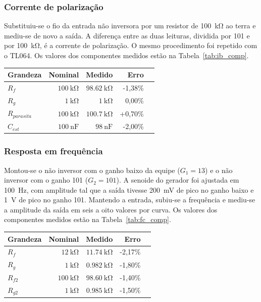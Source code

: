 \documentclass[11pt,a4paper]{article}
\begin{document}
\subsubsection{Corrente de polarização}

Substituiu-se o fio da entrada não inversora por um resistor de \SI{100}{\kilo\ohm} ao terra e mediu-se de novo a saída. A diferença entre as duas leituras, dividida por 101 e por \SI{100}{\kilo\ohm}, é a corrente de polarização. O mesmo procedimento foi repetido com o TL064. Os valores dos componentes medidos estão na Tabela~\ref{tab:ib_comp}.

\begin{center}
\begin{tabular}{@{}lrrrr@{}}
\toprule
\label{tab:ib_comp}
\textbf{Grandeza} & \textbf{Nominal} & \textbf{Medido} & \textbf{Erro} \\
\midrule
  $R_f$ & $\SI{100}{\kilo\ohm}$ & $\SI{98,62}{\kilo\ohm}$ & -1,38\% \\
  $R_g$ & $\SI{1}{\kilo\ohm}$ & $\SI{1}{\kilo\ohm}$ & 0,00\% \\
  $R_{parasita} $ & $\SI{100}{\kilo\ohm}$ & $\SI{100,7}{\kilo\ohm}$ & +0,70\% \\
  $C_{est}$ & $\SI{100}{\nano\farad}$ & $\SI{98}{\nano\farad}$ & -2,00\% \\
\bottomrule
\end{tabular}
\end{center}

\subsubsection{Resposta em frequência}

Montou-se o não inversor com o ganho baixo da equipe ($G_1 = 13$) e o não inversor com o ganho 101 ($G_2 = 101$). A senoide do gerador foi ajustada em \SI{100}{\hertz}, com amplitude tal que a saída tivesse \SI{200}{\milli\volt} de pico no ganho baixo e \SI{1}{\volt} de pico no ganho 101. Mantendo a entrada, subiu-se a frequência e mediu-se a amplitude da saída em seis a oito valores por curva. Os valores dos componentes medidos estão na Tabela~\ref{tab:fc_comp}.

\begin{center}
\begin{tabular}{@{}lrrrr@{}}
\toprule
\label{tab:fc_comp}
\textbf{Grandeza} & \textbf{Nominal} & \textbf{Medido} & \textbf{Erro} \\
\midrule
  $R_f$ & $\SI{12}{\kilo\ohm}$ & $\SI{11,74}{\kilo\ohm}$ & -2,17\% \\
  $R_g$ & $\SI{1}{\kilo\ohm}$ & $\SI{0,982}{\kilo\ohm}$ & -1,80\% \\
  $R_{f2}$ & $\SI{100}{\kilo\ohm}$ & $\SI{98,60}{\kilo\ohm}$ & -1,40\% \\
  $R_{g2}$ & $\SI{1}{\kilo\ohm}$ & $\SI{0,985}{\kilo\ohm}$ & -1,50\% \\
\bottomrule
\end{tabular}
\end{center}
\end{document}
